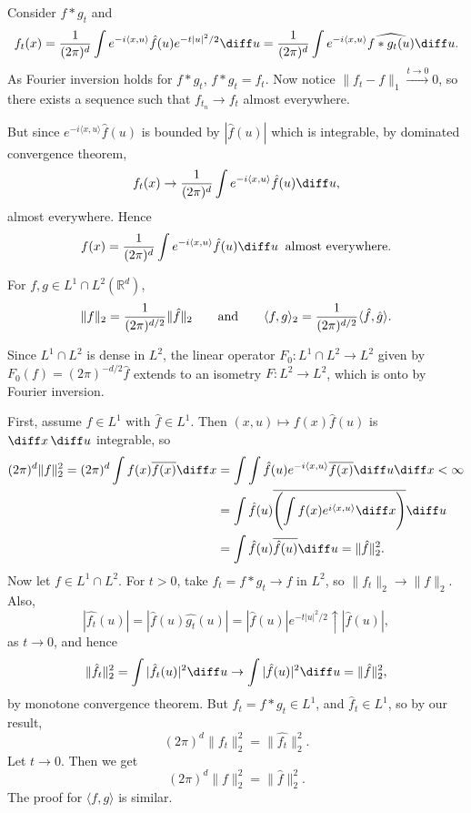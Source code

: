 \documentclass[12pt]{article}
\begin{document}
\begin{proofbox}
	Consider $f \ast g_t$ and 
	\[
		f_t(x) = \frac{1}{(2 \pi)^d} \int e^{-i\langle x, u\rangle} \hat f(u) e^{-t|u|^2/2}\diff u = \frac{1}{(2 \pi)^d} \int e^{-i \langle x, u \rangle} \widehat{f \ast g_t(u)} \diff u.
	\]
	As Fourier inversion holds for $f \ast g_t$, $f \ast g_t = f_t$. Now notice $\|f_t - f\|_1 \overset{t \to 0} \to 0$, so there exists a sequence such that $f_{t_n} \to f_t$ almost everywhere.

	But since $e^{-i \langle x, u \rangle} \hat f(u)$ is bounded by $|\hat f(u)|$ which is integrable, by dominated convergence theorem,
	\[
	f_t(x) \to \frac{1}{(2 \pi)^d} \int e^{-i \langle x, u \rangle} \hat f(u) \diff u,
	\]
	almost everywhere. Hence
	\[
		f(x) = \frac{1}{(2 \pi)^d} \int e^{-i \langle x, u\rangle} \hat f(u) \diff u \;\;\text{almost everywhere}.
	\]
\end{proofbox}

\begin{theorem}[Plancherel]
	For $f, g \in L^1 \cap L^2(\mathbb{R}^d)$,
	\[
		\|f\|_2 = \frac{1}{(2 \pi)^{d/2}}\|\hat f\|_2 \qquad\text{\normalfont and}\qquad \langle f, g\rangle_2 = \frac{1}{(2 \pi)^{d/2}}\langle\hat f, \hat g\rangle.
	\]
\end{theorem}

\begin{remark}
	Since $L^1 \cap L^2$ is dense in $L^2$, the linear operator $F_0 : L^1 \cap L^2 \to L^2$ given by $F_0(f) = (2\pi)^{-d/2} \hat f$ extends to an isometry $F : L^2 \to L^2$, which is onto by Fourier inversion.
\end{remark}


\begin{proofbox}
	First, assume $f \in L^1$ with $\hat f \in L^1$. Then $(x, u) \mapsto f(x) \hat f(u)$ is $\diff x \, \diff u$ integrable, so
	\begin{align*}
		(2 \pi)^d \|f\|_2^2 = (2 \pi)^d \int f(x) \overline{f(x)} \diff x &= \int \int \hat f(u) e^{-i \langle x, u\rangle} \overline{f(x)} \diff u \diff x < \infty \\
									    &= \int \hat f(u) \overline{\Biggl( \int f(x) e^{i \langle x, u\rangle} \diff x \Biggr)} \diff u \\
									    &= \int \hat f(u) \overline{\hat f(u)} \diff u = \|\hat f\|_2^2.
	\end{align*}
	Now let $f \in L^1 \cap L^2$. For $t > 0$, take $f_t = f \ast g_t \to f$ in $L^2$, so $\|f_t\|_2 \to \|f\|_2$. Also,
	\[
		|\hat{f_t}(u)| = |\hat f(u) \hat{g_t}(u)| = |\hat f(u)| e^{-t|u|^2/2} \uparrow |\hat f(u)|,
	\]
	as $t \to 0$, and hence
	\[
		\|\hat{f_t}\|_2^2 = \int |\hat{f_t}(u)|^2 \diff u \to \int |\hat f(u)|^2\diff u = \|\hat f\|_2^2,
	\]
	by monotone convergence theorem. But $f_t = f \ast g_t \in L^1$, and $\hat f_t \in L^1$, so by our result,
	\[
		(2 \pi)^d \|f_t\|_2^2 = \|\hat{f_t}\|_2^2.
	\]
	Let $t \to 0$. Then we get
	\[
		(2 \pi)^d \|f\|_2^2 = \|\hat f\|_2^2.
	\]
	The proof for $\langle f, g\rangle$ is similar.
\end{proofbox}
\end{document}
